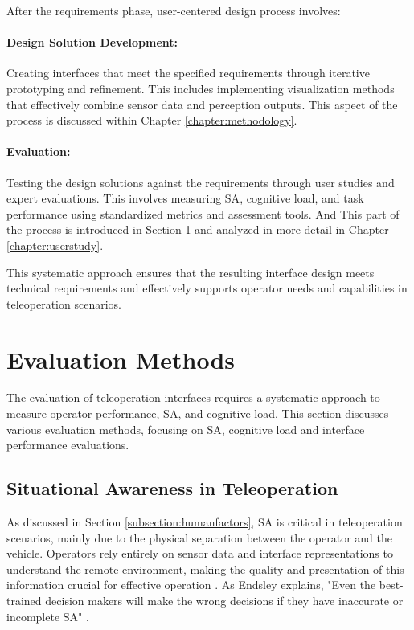After the requirements phase, user-centered design process involves:

\paragraph{Design Solution Development:} Creating interfaces that meet the specified requirements through iterative prototyping and refinement. This includes implementing visualization methods that effectively combine sensor data and perception outputs.
This aspect of the process is discussed within Chapter \ref{chapter:methodology}.
\paragraph{Evaluation:} Testing the design solutions against the requirements through user studies and expert evaluations. This involves measuring \ac{SA}, cognitive load, and task performance using standardized metrics and assessment tools. And This part of the process is introduced in Section \ref{section:evaluationmethods} and analyzed in more detail in Chapter \ref{chapter:userstudy}.

This systematic approach ensures that the resulting interface design meets technical requirements and effectively supports operator needs and capabilities in teleoperation scenarios.


\section{Evaluation Methods}\label{section:evaluationmethods}
The evaluation of teleoperation interfaces requires a systematic approach to measure operator performance, \ac{SA}, and cognitive load. This section discusses various evaluation methods, focusing on \ac{SA}, cognitive load and interface performance evaluations.
\subsection{Situational Awareness in Teleoperation}\label{subsection:situationawareness}
As discussed in Section \ref{subsection:humanfactors}, \ac{SA} is critical in teleoperation scenarios, mainly due to the physical separation between the operator and the vehicle. Operators rely entirely on sensor data and interface representations to understand the remote environment, making the quality and presentation of this information crucial for effective operation \cite{Gnatzig}. As Endsley explains, "Even the best-trained decision makers will make the wrong decisions if they have inaccurate or incomplete SA" \cite{endsley1995toward}.

